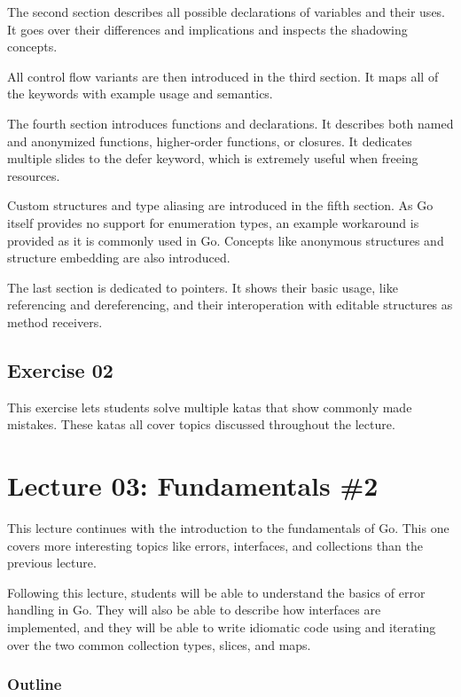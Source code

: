 \documentclass[
  digital,
  color,
  oneside,
  nosansbold,
  nocolorbold,
  nolof,
  nolot,
]{fithesis4}
\begin{document}
The second section describes all possible declarations of variables and their uses. It goes over their differences and implications and inspects the shadowing concepts.

All control flow variants are then introduced in the third section. It maps all of the keywords with example usage and semantics.

The fourth section introduces functions and declarations. It describes both named and anonymized functions, higher-order functions, or closures. It dedicates multiple slides to the defer keyword, which is extremely useful when freeing resources.

Custom structures and type aliasing are introduced in the fifth section. As Go itself provides no support for enumeration types, an example workaround is provided as it is commonly used in Go. Concepts like anonymous structures and structure embedding are also introduced.

The last section is dedicated to pointers. It shows their basic usage, like referencing and dereferencing, and their interoperation with editable structures as method receivers.

\subsection{Exercise 02}

This exercise lets students solve multiple katas that show commonly made mistakes. These katas all cover topics discussed throughout the lecture.

\section{Lecture 03: Fundamentals \#2}

This lecture continues with the introduction to the fundamentals of Go. This one covers more interesting topics like errors, interfaces, and collections than the previous lecture.

Following this lecture, students will be able to understand the basics of error handling in Go. They will also be able to describe how interfaces are implemented, and they will be able to write idiomatic code using and iterating over the two common collection types, slices, and maps.

\subsubsection{Outline}
\end{document}
